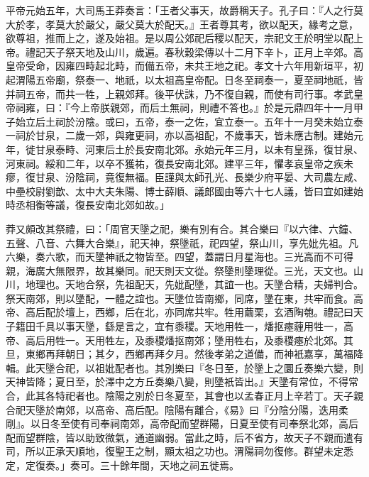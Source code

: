 \begin{pinyinscope}
平帝元始五年，大司馬王莽奏言：「王者父事天，故爵稱天子。孔子曰：『人之行莫大於孝，孝莫大於嚴父，嚴父莫大於配天。』王者尊其考，欲以配天，緣考之意，欲尊祖，推而上之，遂及始祖。是以周公郊祀后稷以配天，宗祀文王於明堂以配上帝。禮記天子祭天地及山川，歲遍。春秋穀梁傳以十二月下辛卜，正月上辛郊。高皇帝受命，因雍四畤起北畤，而備五帝，未共王地之祀。孝文十六年用新垣平，初起渭陽五帝廟，祭泰一、地祇，以太祖高皇帝配。日冬至祠泰一，夏至祠地祇，皆并祠五帝，而共一牲，上親郊拜。後平伏誅，乃不復自親，而使有司行事。孝武皇帝祠雍，曰：『今上帝朕親郊，而后土無祠，則禮不答也。』於是元鼎四年十一月甲子始立后土祠於汾陰。或曰，五帝，泰一之佐，宜立泰一。五年十一月癸未始立泰一祠於甘泉，二歲一郊，與雍更祠，亦以高祖配，不歲事天，皆未應古制。建始元年，徙甘泉泰畤、河東后土於長安南北郊。永始元年三月，以未有皇孫，復甘泉、河東祠。綏和二年，以卒不獲祐，復長安南北郊。建平三年，懼孝哀皇帝之疾未瘳，復甘泉、汾陰祠，竟復無福。臣謹與太師孔光、長樂少府平晏、大司農左咸、中壘校尉劉歆、太中大夫朱陽、博士薛順、議郎國由等六十七人議，皆曰宜如建始時丞相衡等議，復長安南北郊如故。」

莽又頗改其祭禮，曰：「周官天墬之祀，樂有別有合。其合樂曰『以六律、六鐘、五聲、八音、六舞大合樂』，祀天神，祭墬祇，祀四望，祭山川，享先妣先祖。凡六樂，奏六歌，而天墬神祇之物皆至。四望，蓋謂日月星海也。三光高而不可得親，海廣大無限界，故其樂同。祀天則天文從。祭墬則墬理從。三光，天文也。山川，地理也。天地合祭，先祖配天，先妣配墬，其誼一也。天墬合精，夫婦判合。祭天南郊，則以墬配，一體之誼也。天墬位皆南鄉，同席，墬在東，共牢而食。高帝、高后配於壇上，西鄉，后在北，亦同席共牢。牲用繭栗，玄酒陶匏。禮記曰天子籍田千具以事天墬，繇是言之，宜有黍稷。天地用牲一，燔抠瘞薶用牲一，高帝、高后用牲一。天用牲左，及黍稷燔抠南郊；墬用牲右，及黍稷瘞於北郊。其旦，東鄉再拜朝日；其夕，西鄉再拜夕月。然後孝弟之道備，而神衹嘉享，萬福降輯。此天墬合祀，以祖妣配者也。其別樂曰『冬日至，於墬上之圜丘奏樂六變，則天神皆降；夏日至，於澤中之方丘奏樂八變，則墬衹皆出。』天墬有常位，不得常合，此其各特祀者也。陰陽之別於日冬夏至，其會也以孟春正月上辛若丁。天子親合祀天墬於南郊，以高帝、高后配。陰陽有離合，《易》曰『分陰分陽，迭用柔剛』。以日冬至使有司奉祠南郊，高帝配而望群陽，日夏至使有司奉祭北郊，高后配而望群陰，皆以助致微氣，通道幽弱。當此之時，后不省方，故天子不親而遣有司，所以正承天順地，復聖王之制，顯太祖之功也。渭陽祠勿復修。群望未定悉定，定復奏。」奏可。三十餘年間，天地之祠五徙焉。


\end{pinyinscope}
